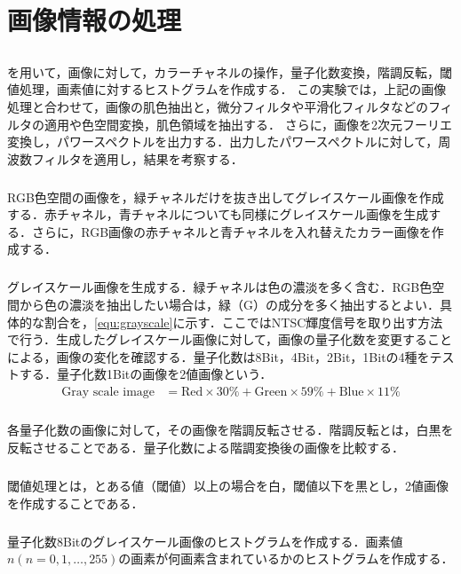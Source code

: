 \chapter{画像情報の処理}
\section{\purpose}
\matlab を用いて，画像に対して，カラーチャネルの操作，量子化数変換，階調反転，閾値処理，画素値に対するヒストグラムを作成する．
この実験では，上記の画像処理と合わせて，画像の肌色抽出と，微分フィルタや平滑化フィルタなどのフィルタの適用や色空間変換，肌色領域を抽出する．
さらに，画像を2次元フーリエ変換し，パワースペクトルを出力する．出力したパワースペクトルに対して，周波数フィルタを適用し，結果を考察する．
\paragraph{\kadaiaa}RGB色空間の画像を，緑チャネルだけを抜き出してグレイスケール画像を作成する．赤チャネル，青チャネルについても同様にグレイスケール画像を生成する．さらに，RGB画像の赤チャネルと青チャネルを入れ替えたカラー画像を作成する．
\paragraph{\kadaiab}グレイスケール画像を生成する．緑チャネルは色の濃淡を多く含む．RGB色空間から色の濃淡を抽出したい場合は，緑（G）の成分を多く抽出するとよい．具体的な割合を，\eqref{equ:grayscale}に示す．ここではNTSC輝度信号を取り出す方法で行う．生成したグレイスケール画像に対して，画像の量子化数を変更することによる，画像の変化を確認する．量子化数は8Bit，4Bit，2Bit，1Bitの4種をテストする．量子化数1Bitの画像を2値画像という．
\begin{align}
    \textrm{Gray scale image} & = \textrm{Red}\times 30\% +\textrm{Green}\times 59\% +\textrm{Blue}\times 11\%\label{equ:grayscale}
\end{align}
\paragraph{\kadaiac}各量子化数の画像に対して，その画像を階調反転させる．階調反転とは，白黒を反転させることである．量子化数による階調変換後の画像を比較する．
\paragraph{\kadaiad}閾値処理とは，とある値（閾値）以上の場合を白，閾値以下を黒とし，2値画像を作成することである．
\paragraph{\kadaiae}量子化数8Bitのグレイスケール画像のヒストグラムを作成する．画素値\(n(n=0,1,\dots ,255)\)の画素が何画素含まれているかのヒストグラムを作成する．
